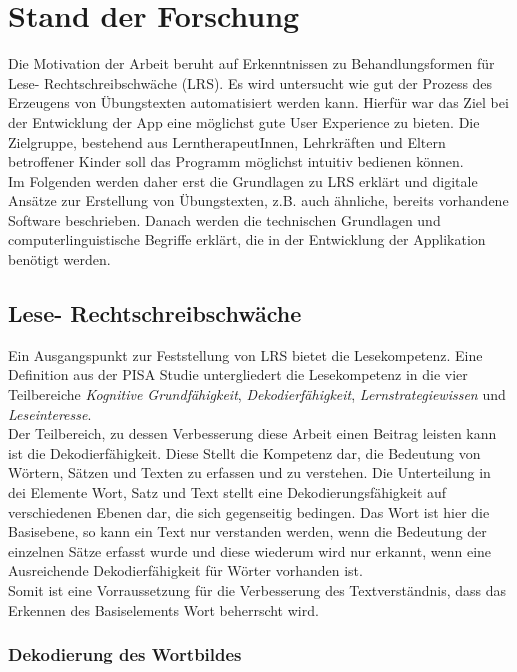 
\chapter{Stand der Forschung}

Die Motivation der Arbeit beruht auf Erkenntnissen zu Behandlungsformen für Lese- Rechtschreibschwäche (LRS). Es wird untersucht wie gut der Prozess des Erzeugens von Übungstexten automatisiert werden kann. Hierfür war das Ziel bei der Entwicklung der App eine möglichst gute User Experience zu bieten. Die Zielgruppe, bestehend aus LerntherapeutInnen, Lehrkräften und Eltern betroffener Kinder soll das Programm möglichst intuitiv bedienen können.\\
Im Folgenden werden daher erst die Grundlagen zu LRS erklärt und digitale Ansätze zur Erstellung von Übungstexten, z.B. auch ähnliche, bereits vorhandene Software beschrieben. Danach werden die technischen Grundlagen und computerlinguistische Begriffe erklärt, die in der Entwicklung der Applikation benötigt werden.

\section{Lese- Rechtschreibschwäche}

Ein Ausgangspunkt zur Feststellung von LRS bietet die Lesekompetenz. Eine Definition aus der PISA Studie untergliedert die Lesekompetenz in die vier Teilbereiche \textit{Kognitive Grundfähigkeit}, \textit{Dekodierfähigkeit}, \textit{Lernstrategiewissen} und \textit{Leseinteresse}\cite{Schulte-Koerne2014}.\\
Der Teilbereich, zu dessen Verbesserung diese Arbeit einen Beitrag leisten kann ist die Dekodierfähigkeit. Diese Stellt die Kompetenz dar, die Bedeutung von Wörtern, Sätzen und Texten zu erfassen und zu verstehen. Die Unterteilung in dei Elemente Wort, Satz und Text stellt eine Dekodierungsfähigkeit auf verschiedenen Ebenen dar, die sich gegenseitig bedingen. Das Wort ist hier die Basisebene, so kann ein Text nur verstanden werden, wenn die Bedeutung der einzelnen Sätze erfasst wurde und diese wiederum wird nur erkannt, wenn eine Ausreichende Dekodierfähigkeit für Wörter vorhanden ist.\\
Somit ist eine Vorraussetzung für die Verbesserung des Textverständnis, dass das Erkennen des Basiselements Wort beherrscht wird.

\subsection{Dekodierung des Wortbildes}
\label{sec:dekodierung}

